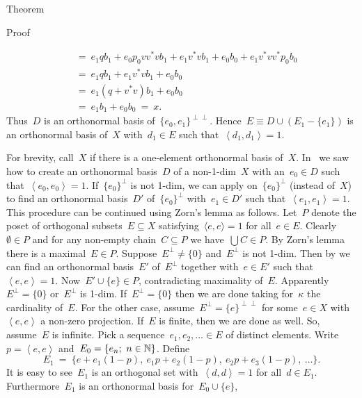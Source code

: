 \documentclass[b]{subfiles}
\begin{document}
\begin{parsec}
\begin{point}{Theorem}
\begin{point}{Proof}
\begin{point}
\begin{align*}
    &\ = \ e_1 q b_1 + e_0 p_0 vv^* vb_1 + e_1v^*vb_1 + e_0 b_0 + e_1v^* vv^* p_0 b_0 \\
    &\ = \ e_1 q b_1 + e_1v^*vb_1 + e_0 b_0  \\
    &\ = \ e_1 (q + v^*v) b_1 + e_0 b_0  \\
    &\ = \ e_1 b_1 + e_0 b_0 \ = \ x.
\end{align*}
Thus~$D$ is an orthonormal basis of~$\{e_0, e_1\}^{\perp\perp}$.
Hence~$E \equiv D \cup (E_1 - \{e_1\})$ is an orthonormal basis of~$X$
with~$d_1 \in E$ such that~$\left<d_1,d_1\right>=1$.
\end{point}
\begin{point}%
For brevity, call~$X$  if there is a one-element orthonormal basis of~$X$.
In~ we saw
    how to create an orthonormal basis~$D$ of a non-1-dim~$X$
    with an~$e_0 \in D$ such that~$\left<e_0,e_0\right>=1$.
If~$\{e_0\}^\perp$ is not 1-dim,
    we can apply 
    on~$\{e_0\}^\perp$ (instead of~$X$)
    to find an orthonormal basis~$D'$ of~$\{e_0\}^\perp$
    with~$e_1 \in D'$ such that~$\left<e_1,e_1\right>=1$.
This procedure can be continued using Zorn's lemma as follows.
Let~$P$ denote the poset of orthogonal subsets~$E \subseteq X$
    satisfying~$\langle e,e\rangle = 1$ for all~$e\in E$.
Clearly~$\emptyset\in P$
and for any non-empty chain~$C \subseteq P$
    we have~$\bigcup C \in P$.
By Zorn's lemma there is a maximal~$E \in P$.
Suppose~$E^\perp \neq \{0\}$ and~$E^\perp$ is not 1-dim.
Then by 
    we can find an orthonormal basis~$E'$ of~$E^\perp$
    together with~$e \in E'$ such that~$\left<e,e\right>=1$.
Now~$E' \cup \{e\} \in P$, contradicting maximality of~$E$.
Apparently~$E^\perp = \{0\}$ or~$E^\perp$ is 1-dim.
If~$E^\perp = \{0\}$
    then we are done
    taking for~$\kappa$ the cardinality of~$E$.
For the other case, assume~$E^\perp = \{e\}^{\perp\perp}$
    for some~$e \in X$ with~$\left<e,e\right>$ a non-zero projection.
If~$E$ is finite, then we are done as well.
So, assume~$E$ is infinite.
Pick a sequence~$e_1, e_2, \ldots \in E$ of distinct elements.
Write~$p = \left<e,e\right>$
    and~$E_0 = \{e_n;\ n\in \mathbb{N}\}$.
Define
\begin{equation*}
    E_1 \ =\  \{e + e_1(1-p), \ e_1p + e_2(1-p),\  e_2p  +e_3(1-p),\  \ldots \}.
\end{equation*}
It is easy to see~$E_1$ is an orthogonal set
    with~$\left<d,d\right>=1$ for all~$d \in E_1$.
Furthermore~$E_1$ is an orthonormal basis for~$E_0 \cup \{e\}$,

\end{point}
\end{point}
\end{point}
\end{parsec}
\end{document}
